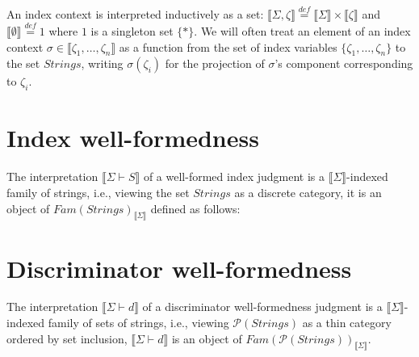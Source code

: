 \documentclass{article}
\newcommand{\sem}[1]{\llbracket #1 \rrbracket}
\newcommand{\defeq}{\overset{\mathit{def}}{=}}
\begin{document}
An index context is interpreted inductively as a set: $\sem{\Sigma,\zeta} \defeq \sem{\Sigma} \times \sem{\zeta}$ and $\sem{\emptyset} \defeq 1$ where $1$ is a singleton set $\{ \ast \}$. We will often treat an element of an index context $\sigma \in \sem{\zeta_1,\ldots,\zeta_n}$ as a function from the set of index variables $\{ \zeta_1, \ldots, \zeta_n \}$ to the set $\mathit{Strings}$, writing $\sigma(\zeta_i)$ for the projection of $\sigma$'s component corresponding to $\zeta_i$. 

\section*{Index well-formedness}

The interpretation $\sem{\Sigma \vdash S}$ of a well-formed index judgment is a $\sem{\Sigma}$-indexed family of strings, i.e., viewing the set $\mathit{Strings}$ as a discrete category, it is an object of $\mathit{Fam}(\mathit{Strings})_{\sem{\Sigma}}$ defined as follows:

\section*{Discriminator well-formedness}


The interpretation $\sem{\Sigma \vdash d}$ of a discriminator well-formedness judgment is a $\sem{\Sigma}$-indexed family of sets of strings, i.e., viewing $\mathcal P(\mathit{Strings})$ as a thin category ordered by set inclusion, $\sem{\Sigma \vdash d}$ is an object of $\mathit{Fam}(\mathcal P(\mathit{Strings}))_{\sem{\Sigma}}$. 
\end{document}
